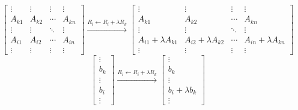 	\[ \begin{bmatrix} \vdots & \vdots & \vdots & \vdots \\ A_{k1} & A_{k2} & \cdots & A_{kn} \\ \vdots & \vdots & \ddots & \vdots \\ A_{i1} & A_{i2} & \cdots & A_{in} \\ \vdots & \vdots & \vdots & \vdots \end{bmatrix} \xrightarrow{R_i \leftarrow R_i + \lambda{}R_k} \begin{bmatrix} \vdots & \vdots & \vdots & \vdots \\ A_{k1} & A_{k2} & \cdots & A_{kn} \\ \vdots & \vdots & \ddots & \vdots \\ A_{i1}+\lambda{}A_{k1} & A_{i2}+\lambda{}A_{k2} & \cdots & A_{in}+\lambda{}A_{kn} \\ \vdots & \vdots & \vdots & \vdots \end{bmatrix}\]
		\[ \begin{bmatrix} \vdots \\ b_k \\ \vdots \\ b_i \\ \vdots \end{bmatrix} \xrightarrow{R_i \leftarrow R_i + \lambda{}R_k} \begin{bmatrix} \vdots \\ b_k \\ \vdots \\ b_i + \lambda{}b_k \\ \vdots \end{bmatrix} \]
			
%

